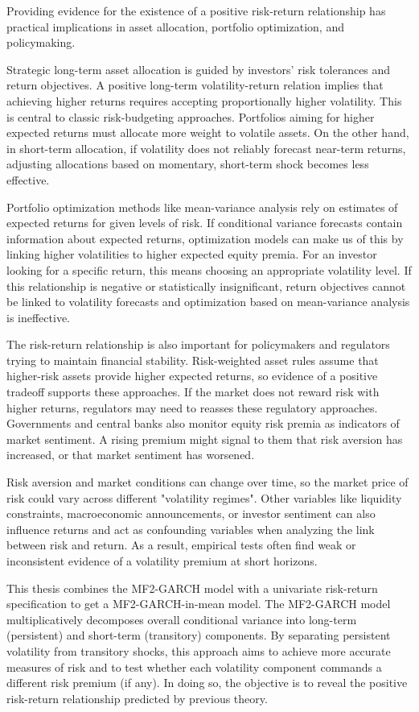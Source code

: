 \documentclass[12pt]{article}
\begin{document}
Providing evidence for the existence of a positive risk-return relationship has practical implications in asset allocation, portfolio optimization, and policymaking.\par
Strategic long-term asset allocation is guided by investors' risk tolerances and return objectives. A positive long-term volatility-return relation implies that achieving higher returns requires accepting proportionally higher volatility. This is central to classic risk-budgeting approaches.  Portfolios aiming for higher expected returns must allocate more weight to volatile assets. On the other hand, in short-term allocation, if volatility does not reliably forecast near-term returns, adjusting allocations based on momentary, short-term shock becomes less effective.\par
Portfolio optimization methods like mean-variance analysis rely on estimates of expected returns for given levels of risk. If conditional variance forecasts contain information about expected returns, optimization models can make us of this by linking higher volatilities to higher expected equity premia. For an investor looking for a specific return, this means choosing an appropriate volatility level. If this relationship is negative or statistically insignificant, return objectives cannot be linked to volatility forecasts and optimization based on mean-variance analysis is ineffective.\par
The risk-return relationship is also important for policymakers and regulators trying to maintain financial stability. Risk-weighted asset rules assume that higher-risk assets provide higher expected returns, so evidence of a positive tradeoff supports these approaches. If the market does not reward risk with higher returns, regulators may need to reasses these regulatory approaches. Governments and central banks also monitor equity risk premia as indicators of market sentiment. A rising premium might signal to them that risk aversion has increased, or that market sentiment has worsened.\par
Risk aversion and market conditions can change over time, so the market price of risk could vary across different "volatility regimes". Other variables like liquidity constraints, macroeconomic announcements, or investor sentiment can also influence returns and act as confounding variables when analyzing the link between risk and return. As a result, empirical tests often find weak or inconsistent evidence of a volatility premium at short horizons.\par
This thesis combines the MF2-GARCH model with a univariate risk-return specification to get a MF2-GARCH-in-mean model. The MF2-GARCH model multiplicatively decomposes overall conditional variance into long-term (persistent) and short-term (transitory) components. By separating persistent volatility from transitory shocks, this approach aims to achieve more accurate measures of risk and to test whether each volatility component commands a different risk premium (if any). In doing so, the objective is to reveal the positive risk-return relationship predicted by previous theory.
\end{document}
